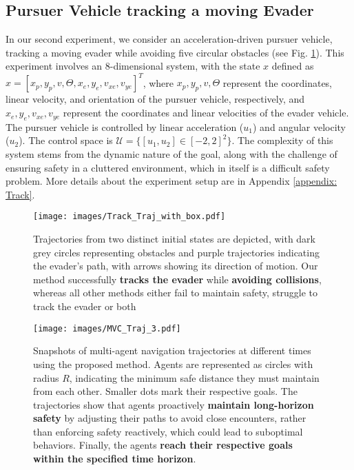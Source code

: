 \subsection{Pursuer Vehicle tracking a moving Evader}
In our second experiment, we consider an acceleration-driven pursuer vehicle, tracking a moving evader while avoiding five circular obstacles (see Fig. \ref{fig: Track_Trajectories}). This experiment involves an 8-dimensional system, with the state $x$ defined as $x = [x_p, y_p, v, \Theta, x_{e}, y_{e}, v_{xe}, v_{ye}]^T$, where $x_p, y_p, v, \Theta$ represent the coordinates, linear velocity, and orientation of the pursuer vehicle, respectively, and $x_e, y_e, v_{xe}, v_{ye}$ represent the coordinates and linear velocities of the evader vehicle. The pursuer vehicle is controlled by linear acceleration ($u_1$) and angular velocity ($u_2$). The control space is $\mathcal{U} = \{[u_1, u_2] \in [-2, 2]^2\}$. The complexity of this system stems from the dynamic nature of the goal, along with the challenge of
ensuring safety in a cluttered environment, which in itself is a difficult safety problem. More details about the experiment setup are in Appendix \ref{appendix: Track}.
% 
\begin{figure}[t]
    \centering
    \texttt{[image: images/Track\_Traj\_with\_box.pdf]}
    \vspace{-2em}
    \caption{Trajectories from two distinct initial states are depicted, with dark grey circles representing obstacles and purple trajectories indicating the evader's path, with arrows showing its direction of motion. Our method successfully \textbf{tracks the evader} while \textbf{avoiding collisions}, whereas all other methods either fail to maintain safety, struggle to track the evader or both}
    \vspace{-0.8em}
    \label{fig: Track_Trajectories}
\end{figure}

\begin{figure*}[ht]
    \centering
    \texttt{[image: images/MVC\_Traj\_3.pdf]}
    \vspace{-2em}
    \caption{Snapshots of multi-agent navigation trajectories at different times using the proposed method. Agents are represented as circles with radius $R$, indicating the minimum safe distance they must maintain from each other. Smaller dots mark their respective goals. The trajectories show that agents proactively \textbf{maintain long-horizon safety} by adjusting their paths to avoid close encounters, rather than enforcing safety reactively, which could lead to suboptimal behaviors. Finally, the agents \textbf{reach their respective goals within the specified time horizon}.}
    \label{fig: MVC_Trajectories}
    \vspace{-0.8em}
\end{figure*}

